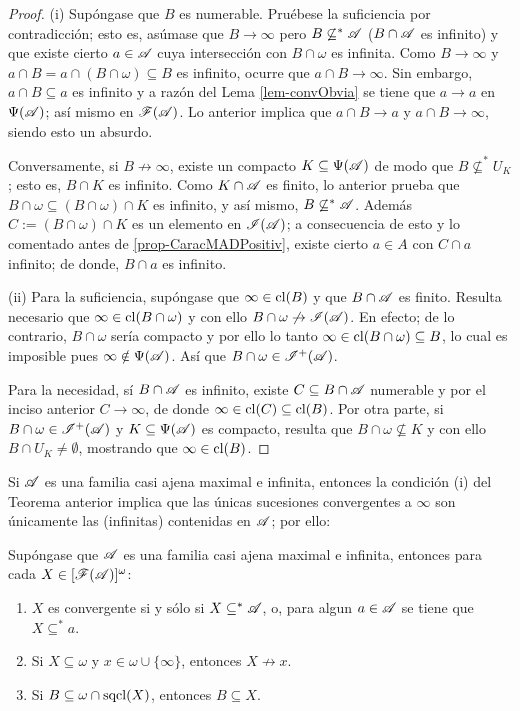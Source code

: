  \begin{proof}
  (i) Supóngase que $B$ es numerable. Pruébese la suficiencia por contradicción; esto es, asúmase que $B \to \infty$ pero $B \not\subseteq^* \mathscr{A}$ ($B\cap \mathscr{A}$ es infinito) y que existe cierto $a \in \mathscr{A}$ cuya intersección con $B \cap \omega$ es infinita. Como $B\to \infty$ y $a \cap B = a \cap (B \cap \omega) \subseteq B$ es infinito, ocurre que $a \cap B \to \infty$. Sin embargo, $a \cap B \subseteq a$ es infinito y a razón del Lema \ref{lem-convObvia} se tiene que $a \to a$ en $\Psi(\mathscr{A})$; así mismo en $\mathscr{F}(\mathscr{A})$. Lo anterior implica que $a \cap B \to a$ y $a \cap B \to \infty$, siendo esto un absurdo.

  Conversamente, si $B \not\to \infty$, existe un compacto $K \subseteq \Psi(\mathscr{A})$ de modo que $B \not\subseteq^* U_K$; esto es, $B \cap K$ es infinito. Como $K \cap \mathscr{A}$ es finito, lo anterior prueba que $B \cap \omega \subseteq (B \cap \omega) \cap K$ es infinito, y así mismo, $B \not\subseteq^* \mathscr{A}$. Además $C:=(B \cap \omega) \cap K$ es un elemento en $\mathscr{I}(\mathscr{A})$; a consecuencia de esto y lo comentado antes de \ref{prop-CaracMADPositiv}, existe cierto $a \in A$ con $C \cap a$ infinito; de donde, $B \cap a$ es infinito.

  (ii) Para la suficiencia, supóngase que $\infty \in \operatorname{cl}(B)$ y que $B \cap \mathscr{A}$ es finito. Resulta necesario que $\infty \in \operatorname{cl}(B \cap \omega)$ y con ello $B \cap \omega \not\to \mathscr{I}(\mathscr{A})$. En efecto; de lo contrario, $B \cap \omega$ sería compacto y por ello lo tanto $\infty \in \operatorname{cl}(B \cap \omega) \subseteq B$, lo cual es imposible pues $\infty \notin \Psi(\mathscr{A})$. Así que $B \cap \omega \in \mathscr{I}^+(\mathscr{A})$.

  Para la necesidad, sí $B \cap \mathscr{A}$ es infinito, existe $C \subseteq B \cap \mathscr{A}$ numerable y por el inciso anterior $C \to \infty$, de donde $\infty \in \operatorname{cl}(C) \subseteq \operatorname{cl}(B)$. Por otra parte, si $B \cap \omega \in \mathscr{I}^+(\mathscr{A})$ y $K \subseteq \Psi(\mathscr{A})$ es compacto, resulta que $B \cap \omega \not\subseteq K$ y con ello $B\cap U_K \neq \emptyset$, mostrando que $\infty \in \operatorname{cl}(B)$.
 \end{proof}

 Si $\mathscr{A}$ es una familia casi ajena maximal e infinita, entonces la condición (i) del Teorema anterior implica que las únicas sucesiones convergentes a $\infty$ son únicamente las (infinitas) contenidas en $\mathscr{A}$; por ello:
 \begin{corolario}\label{cor-convMaximal}
  Supóngase que $\mathscr{A}$ es una familia casi ajena maximal e infinita, entonces para cada $X \in [\mathscr{F}(\mathscr{A})]^\omega$:
  \begin{enumerate}
   \item $X$ es convergente si y sólo si $X \subseteq^* \mathscr{A}$, o, para algun $a \in \mathscr{A}$ se tiene que $X \subseteq^* a$.
   \item Si $X \subseteq \omega$ y $x \in \omega \cup \{\infty\}$, entonces $X \not\to x$.
   \item Si $B \subseteq \omega \cap \operatorname{sqcl}(X)$, entonces $B \subseteq X$.
  \end{enumerate}
 \end{corolario}


